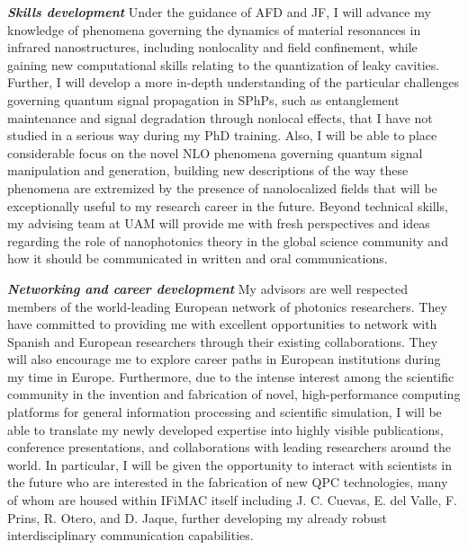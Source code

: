\documentclass[11pt,a4paper]{article}
\begin{document}

\textbf{\textit{Skills development}} Under the guidance of AFD and JF, I will advance my knowledge of phenomena governing the dynamics of material resonances in infrared nanostructures, including nonlocality and field confinement, while gaining new computational skills relating to the quantization of leaky cavities. Further, I will develop a more in-depth understanding of the particular challenges governing quantum signal propagation in SPhPs, such as entanglement maintenance and signal degradation through nonlocal effects, that I have not studied in a serious way during my PhD training. Also, I will be able to place considerable focus on the novel NLO phenomena governing quantum signal manipulation and generation, building new descriptions of the way these phenomena are extremized by the presence of nanolocalized fields that will be exceptionally useful to my research career in the future. Beyond technical skills, my advising team at UAM will provide me with fresh perspectives and ideas regarding the role of nanophotonics theory in the global science community and how it should be communicated in written and oral communications. 





\textbf{\textit{Networking and career development}} My advisors are well respected members of the world-leading European network of photonics researchers. They have committed to providing me with excellent opportunities to network with Spanish and European researchers through their existing collaborations. They will also encourage me to explore career paths in European institutions during my time in Europe. Furthermore, due to the intense interest among the scientific community in the invention and fabrication of novel, high-performance computing platforms for general information processing and scientific simulation, I will be able to translate my newly developed expertise into highly visible publications, conference presentations, and collaborations with leading researchers around the world. In particular, I will be given the opportunity to interact with scientists in the future who are interested in the fabrication of new QPC technologies, many of whom are housed within IFiMAC itself including J. C. Cuevas, E. del Valle, F. Prins, R. Otero, and D. Jaque, further developing my already robust interdisciplinary communication capabilities.
\end{document}
